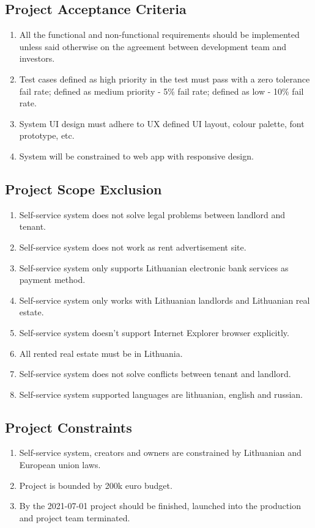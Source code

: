 \documentclass{VUMIFPSkursinis}
\begin{document}
	\subsection{Project Acceptance Criteria}
		\begin{enumerate}
			\item{All the functional and non-functional requirements should be implemented unless said otherwise on the agreement between development team and investors.}
			\item{Test cases defined as high priority in the test must pass with a zero tolerance fail rate; defined as medium priority - 5\% fail rate; defined as low - 10\% fail rate.}
			\item{System UI design must adhere to UX defined UI layout, colour palette, font prototype, etc.}
			\item{System will be constrained to web app with responsive design.}
		\end{enumerate}


	\subsection{Project Scope Exclusion}
		\begin{enumerate}
			\item{Self-service system does not solve legal problems between landlord and tenant.}
			\item{Self-service system does not work as rent advertisement site.}
			\item{Self-service system only supports Lithuanian electronic bank services as payment method.}
			\item{Self-service system only works with Lithuanian landlords and Lithuanian real estate.}
			\item{Self-service system doesn't support Internet Explorer browser explicitly.}
			\item{All rented real estate must be in Lithuania.}
			\item{Self-service system does not solve conflicts between tenant and landlord.}
			\item{Self-service system supported languages are lithuanian, english and russian.}
		\end{enumerate}

	\subsection{Project Constraints}
		\begin{enumerate}
			\item{Self-service system, creators and owners are constrained by Lithuanian and European union laws.}
			\item{Project is bounded by 200k euro budget.}
			\item{By the 2021-07-01 project should be finished, launched into the production and project team terminated.}
		\end{enumerate}
\end{document}
